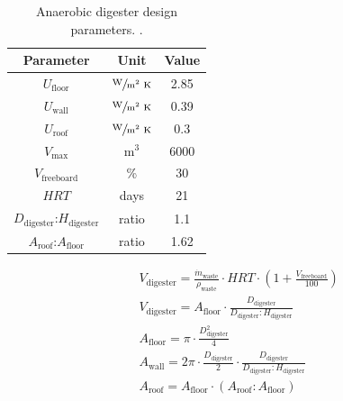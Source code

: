 \begin{refsection}[referencesApD]
\begin{table}[h] 
	\centering
	\caption{Anaerobic digester design parameters. \protect\citep{ADPennState}.} \label{table:AD_U}
	\begin{tabular}{@{}ccc@{}}
		\toprule
		\multicolumn{1}{c}{Parameter} & Unit  & \multicolumn{1}{c}{Value} \\ \midrule
		$U_{\text{floor}}$                        & $\sfrac{\text{W}}{\text{m}^2 \text{ K}}$     & 2.85                      \\
		$U_{\text{wall}}$                         & $\sfrac{\text{W}}{\text{m}^2 \text{ K}}$     & 0.39                      \\
		$U_{\text{roof}}$                         & $\sfrac{\text{W}}{\text{m}^2 \text{ K}}$     & 0.3                       \\
		$V_{\text{max}}$                         & m$^3$    & 6000                      \\
		$V_{\text{freeboard}}$                   & \%    & 30                        \\
		$HRT$                           & days  & 21                        \\
		$D_{\text{digester}}$:$H_{\text{digester}}$                           & ratio & 1.1                       \\
		$A_{\text{roof}}$:$A_{\text{floor}}$                  & ratio & 1.62                      \\ \bottomrule
	\end{tabular} 
\end{table}

\begin{align}
	& V_{\text{digester}} = \frac{\dot{m}_{\text{waste}}}{\rho_{\text{waste}}} \cdot HRT \cdot \left(1 + \frac{V_{\text{freeboard}}}{100}\right) \label{eq:Vdigester1}\\
	& V_{\text{digester}} = A_{\text{floor}} \cdot \frac{D_{\text{digester}}}{D_{\text{digester}}:H_{\text{digester}}} \label{eq:Vdigester2} \\
	& A_{\text{floor}} = \pi \cdot \frac{D_{\text{digester}}^2}{4} \label{eq:Afloor} \\
	& A_{\text{wall}} = 2 \pi \cdot \frac{D_{\text{digester}}}{2} \cdot \frac{D_{\text{digester}}}{D_{\text{digester}}:H_{\text{digester}}} \label{eq:Awall}\\
	& A_{\text{roof}} = A_{\text{floor}} \cdot \left(A_{\text{roof}}:A_{\text{floor}}\right) \label{eq:Aroof}
\end{align}


\end{refsection}
